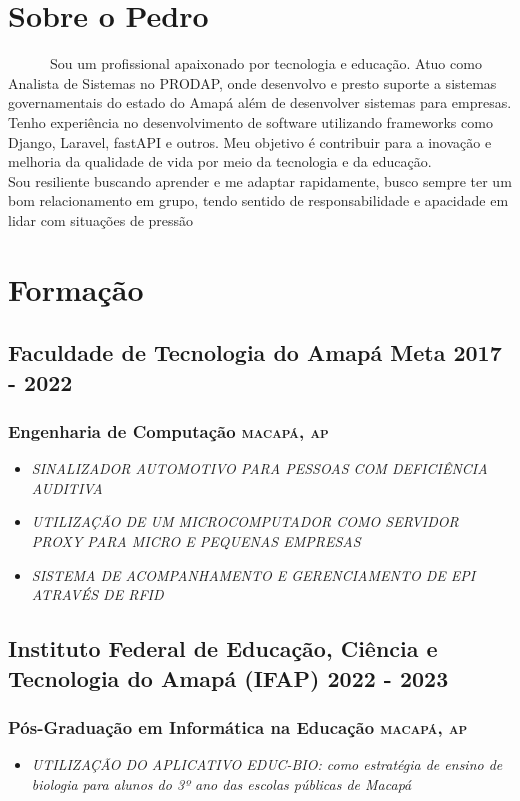 \documentclass{article}
\newcommand{\rside}[1]{\hfill \normalfont\scshape\MakeLowercase{#1}}
\begin{document}
\section{\faUser\enspace Sobre o Pedro}
\begin{description}
  \item \ \ \ \ \ \  Sou um profissional apaixonado por tecnologia e educação. Atuo como Analista de Sistemas no PRODAP, onde desenvolvo e presto suporte a sistemas governamentais do estado do Amapá além de desenvolver sistemas para empresas. Tenho experiência no desenvolvimento de software utilizando frameworks como Django, Laravel, fastAPI e outros. Meu objetivo é contribuir para a inovação e melhoria da qualidade de vida por meio da tecnologia e da educação. \\ Sou resiliente buscando aprender e me adaptar rapidamente, busco sempre ter um bom relacionamento em grupo, tendo sentido de responsabilidade e apacidade em lidar com situações de pressão
\end{description}

\section{\faGraduationCap\enspace Formação}
\subsection{Faculdade de Tecnologia do Amapá Meta  \rside{2017 - 2022}}
\subsubsection{Engenharia de Computação \rside{Macapá, AP}}
\begin{itemize}
  \item \textit{SINALIZADOR AUTOMOTIVO PARA PESSOAS COM DEFICIÊNCIA AUDITIVA}
  \item \textit{UTILIZAÇÃO DE UM MICROCOMPUTADOR COMO SERVIDOR PROXY PARA MICRO E PEQUENAS EMPRESAS}
  \item \textit{SISTEMA DE ACOMPANHAMENTO E GERENCIAMENTO DE EPI ATRAVÉS DE RFID}
\end{itemize}
\subsection{Instituto Federal de Educação, Ciência e Tecnologia do Amapá (IFAP) \rside{2022 - 2023}}
\subsubsection{Pós-Graduação em Informática na Educação \rside{Macapá, AP}}
\begin{itemize}
  \item \textit{UTILIZAÇÃO DO APLICATIVO EDUC-BIO: como estratégia de ensino de biologia para alunos do 3º ano das escolas públicas de Macapá}
\end{itemize}
\end{document}
